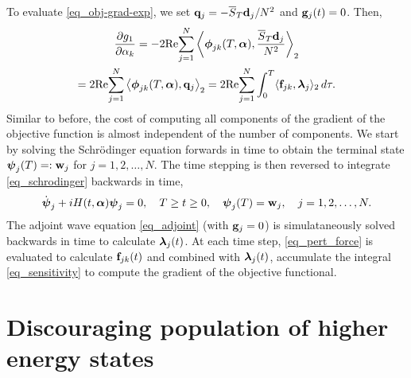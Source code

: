 \documentclass[11pt]{article}
\begin{document}
To evaluate \eqref{eq_obj-grad-exp}, we set ${\mathbf q}_j = -\overline{S}_T {\mathbf d}_j/N^2$ and ${\mathbf g}_j(t)=0$. Then,
\begin{multline}\label{eq_sensitivity}
  \frac{\p g_1}{\p \alpha_k} =
  -2 {\rm Re}\! \sum_{j=1}^N \left\langle \phib_{jk}(T,\alphab),
  \frac{\overline{S}_T \db_j}{N^2}\right\rangle_2 \\
%
  = 2 {\rm Re}\! \sum_{j=1}^N \left\langle \phib_{jk}(T,\alphab),  \qb_j\right\rangle_2 =
  2 {\rm Re}\! \sum_{j=1}^N \int_0^T \langle \fb_{jk},\lambdab_j \rangle_2\, d\tau.
\end{multline}
Similar to before, the cost of computing all components of the gradient of the objective function is
almost independent of the number of components. We start by solving the Schr\"odinger equation
forwards in time to obtain the terminal state $\boldsymbol{\psi}_j(T)=:{\mathbf w}_j$ for $j=1,2,\ldots,N$. The time
stepping is then reversed to integrate \eqref{eq_schrodinger} backwards in time,
\begin{equation}
\dot{\boldsymbol{\psi}}_j + iH(t,\boldsymbol{\alpha})\boldsymbol{\psi}_j=0,\quad T\geq t\geq 0, \quad \boldsymbol{\psi}_j(T)={\mathbf w}_j,\quad j=1,2,\ldots,N.
\end{equation}
The adjoint wave equation \eqref{eq_adjoint}  (with ${\mathbf g}_j=0$) is simulataneously solved backwards in time to
calculate $\boldsymbol{\lambda}_j(t)$. At each time step, \eqref{eq_pert_force} is evaluated to calculate ${\mathbf f}_{jk}(t)$ and combined with
$\boldsymbol{\lambda}_j(t)$, accumulate the integral \eqref{eq_sensitivity} to compute the gradient of the
objective functional.

\section{Discouraging population of higher energy states}
\end{document}
